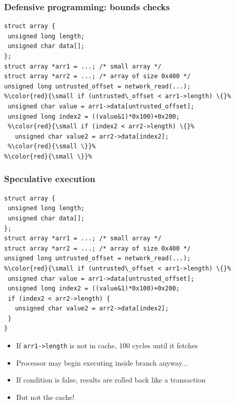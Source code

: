 \documentclass[10pt,handout]{beamer}
\begin{document}

\begin{frame}[fragile]

\frametitle{Defensive programming: bounds checks}

\begin{lstlisting}[basicstyle=\small,style=customjava]
struct array {
 unsigned long length;
 unsigned char data[];
};
struct array *arr1 = ...; /* small array */
struct array *arr2 = ...; /* array of size 0x400 */
unsigned long untrusted_offset = network_read(...);
%\color{red}{\small if (untrusted\_offset < arr1->length) \{}%
 unsigned char value = arr1->data[untrusted_offset];
 unsigned long index2 = ((value&1)*0x100)+0x200;
 %\color{red}{\small if (index2 < arr2->length) \{}%
   unsigned char value2 = arr2->data[index2];
 %\color{red}{\small \}}%
%\color{red}{\small \}}%
\end{lstlisting}

\end{frame}


\begin{frame}[fragile]

\frametitle{Speculative execution}

\begin{lstlisting}[basicstyle=\small,style=customjava]
struct array {
 unsigned long length;
 unsigned char data[];
};
struct array *arr1 = ...; /* small array */
struct array *arr2 = ...; /* array of size 0x400 */
unsigned long untrusted_offset = network_read(...);
%\color{red}{\small if (untrusted\_offset < arr1->length) \{}%
 unsigned char value = arr1->data[untrusted_offset];
 unsigned long index2 = ((value&1)*0x100)+0x200;
 if (index2 < arr2->length) {
   unsigned char value2 = arr2->data[index2];
 }
}
\end{lstlisting}

\begin{itemize}
\item If \texttt{arr1->length} is not in cache, 100 cycles until it fetches
\pause

\item Processor may begin executing inside branch anyway...
\pause

\item If condition is false, results are rolled back like a transaction
\pause

\item But not the cache!

\end{itemize}

\end{frame}
\end{document}
